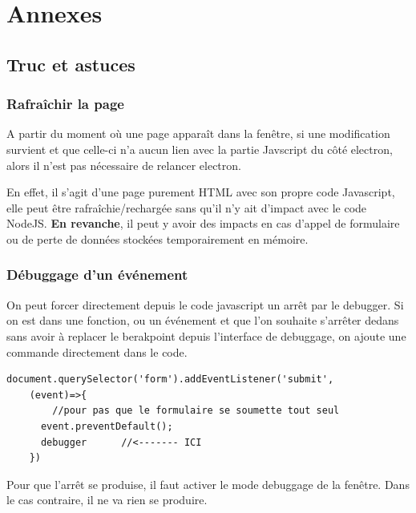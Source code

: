 \documentclass[12pt,oneside]{scrbook}
\begin{document}
\chapter{Annexes}
\section{Truc et astuces}
\subsection{Rafraîchir la page}
A partir du moment où une page apparaît dans la fenêtre, si une modification survient et que celle-ci n'a aucun lien avec la partie Javscript du côté electron, alors il n'est pas nécessaire de relancer electron.

En effet, il s'agit d'une page purement HTML avec son propre code Javascript, elle peut être rafraîchie/rechargée sans qu'il n'y ait d'impact avec le code NodeJS. \textbf{En revanche}, il peut y avoir des impacts en cas d'appel de formulaire ou de perte de données stockées temporairement en mémoire.
\subsection{Débuggage d'un événement}
On peut forcer directement depuis le code javascript un arrêt par le debugger. Si on est dans une fonction, ou un événement et que l'on souhaite s'arrêter dedans sans avoir à replacer le berakpoint depuis l'interface de debuggage, on ajoute une commande directement dans le code.
\begin{verbatim}
document.querySelector('form').addEventListener('submit', 
    (event)=>{
        //pour pas que le formulaire se soumette tout seul
      event.preventDefault();  
      debugger      //<------- ICI
    })
\end{verbatim}
Pour que l'arrêt se produise, il faut activer le mode debuggage de la fenêtre. Dans le cas contraire, il ne va rien se produire.
\backmatter 

\printindex 
\end{document}
